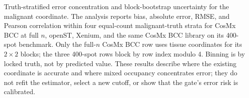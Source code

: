 Truth-stratified error concentration and block-bootstrap uncertainty for the malignant coordinate. The analysis reports bias, absolute error, RMSE, and Pearson correlation within four equal-count malignant-truth strata for CosMx BCC at full \(n\), openST, Xenium, and the same CosMx BCC library on its 400-spot benchmark. Only the full-\(n\) CosMx BCC row uses tissue coordinates for its \(2\times2\) blocks; the three 400-spot rows block by row index modulo 4. Binning is by locked truth, not by predicted value. These results describe where the existing coordinate is accurate and where mixed occupancy concentrates error; they do not refit the estimator, select a new cutoff, or show that the gate's error risk is calibrated.
